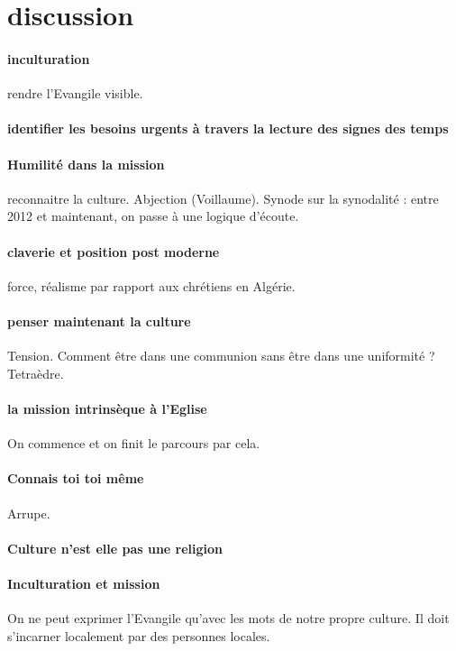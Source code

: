 \section{discussion}

\paragraph{inculturation} rendre l'Evangile visible.

\paragraph{identifier les besoins urgents à travers la lecture des signes des temps} 

\paragraph{Humilité dans la mission} reconnaitre la culture. Abjection (Voillaume). Synode sur la synodalité : entre 2012 et maintenant, on passe à une logique d'écoute. 


\paragraph{claverie et position post moderne} force, réalisme par rapport aux chrétiens en Algérie.  

\paragraph{penser maintenant la culture} Tension. Comment être dans une communion sans être dans une uniformité ? Tetraèdre. 

\paragraph{la mission intrinsèque à l'Eglise} On commence et on finit le parcours par cela. 

\paragraph{Connais toi toi même} Arrupe. 

\paragraph{Culture n'est elle pas une religion}

\paragraph{Inculturation et mission} On ne peut exprimer l'Evangile qu'avec les mots de notre propre culture. Il doit s'incarner localement par des personnes locales. 


